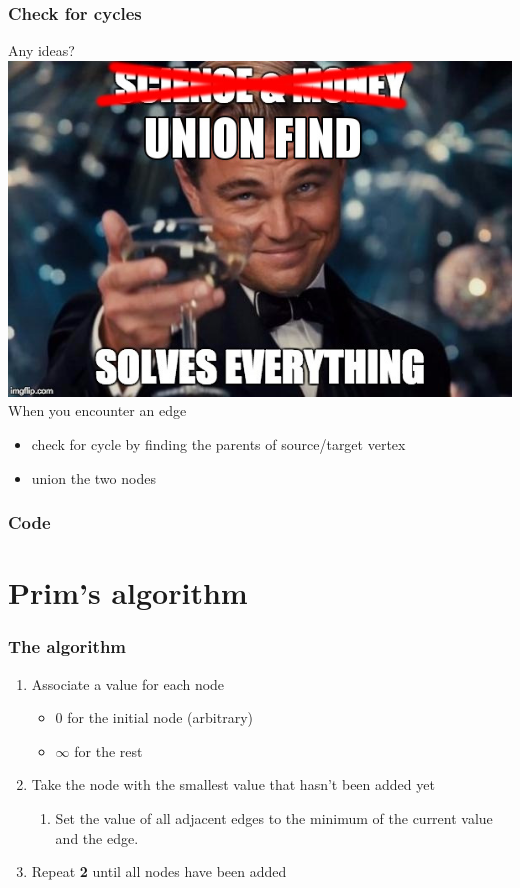 \documentclass[12pt]{beamer}
\begin{document}
\begin{frame}
	\frametitle{Check for cycles}
	Any ideas?\\
	\pause
	\includegraphics[width=0.5\linewidth]{img/uf}\\
	\pause
	When you encounter an edge
	\begin{itemize}
		\item check for cycle by finding the parents of source/target vertex
		\item union the two nodes 
	\end{itemize}
	

\end{frame}
\begin{frame}
	\frametitle{Code}
	
\end{frame}

\section{Prim's algorithm}

\begin{frame}
	\frametitle{The algorithm}
	\begin{enumerate}
		\item Associate a value for each node
		\begin{itemize}
			\item $0$ for the initial node (arbitrary)
			\item $\infty$ for the rest
		\end{itemize}
		\item Take the node with the smallest value that hasn't been added yet
		\begin{enumerate}
			\item Set the value of all adjacent edges to the minimum of the current value and the edge.
		\end{enumerate}
		\item Repeat \textbf{2} until all nodes have been added
	\end{enumerate}
\end{frame}
\end{document}

